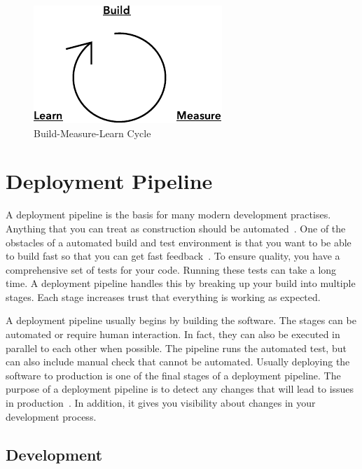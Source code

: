 \documentclass[english]{tktltiki2}
\begin{document}
\begin{figure}[h!]

    \vspace{1cm}
    \centering

    \includegraphics{figures/build-measure-learn}

    \caption{Build-Measure-Learn Cycle}
    \label{figure:build-measure-learn}

\end{figure}


\section{Deployment Pipeline}

A deployment pipeline is the basis for many modern development practises. Anything that you can treat as construction should be automated~\cite{Fow05}. One of the obstacles of a automated build and test environment is that you want to be able to build fast so that you can get fast feedback~\cite{Fow13b}. To ensure quality, you have a comprehensive set of tests for your code. Running these tests can take a long time. A deployment pipeline handles this by breaking up your build into multiple stages. Each stage increases trust that everything is working as expected.

A deployment pipeline usually begins by building the software. The stages can be automated or require human interaction. In fact, they can also be executed in parallel to each other when possible. The pipeline runs the automated test, but can also include manual check that cannot be automated. Usually deploying the software to production is one of the final stages of a deployment pipeline. The purpose of a deployment pipeline is to detect any changes that will lead to issues in production~\cite{Fow13b}. In addition, it gives you visibility about changes in your development process.

\subsection{Development}
\end{document}
